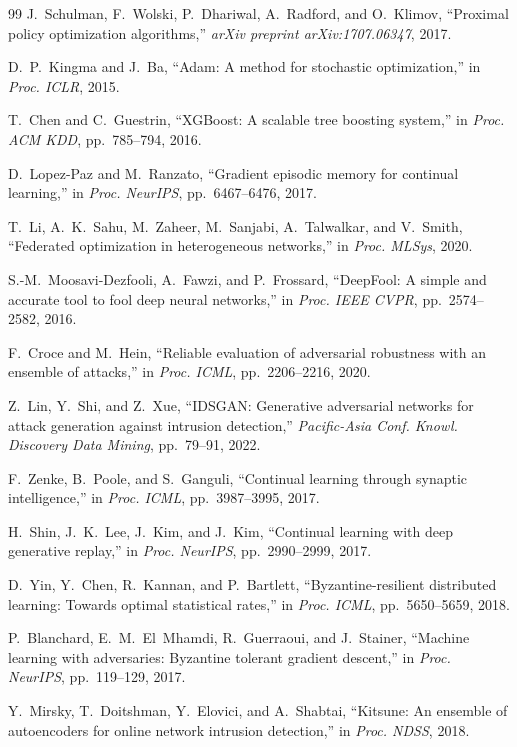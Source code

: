 \documentclass[journal,twoside]{IEEEtran}
\begin{document}
\begin{thebibliography}{99}
J.~Schulman, F.~Wolski, P.~Dhariwal, A.~Radford, and O.~Klimov, ``Proximal policy optimization algorithms,'' \emph{arXiv preprint arXiv:1707.06347}, 2017.

D.~P.~Kingma and J.~Ba, ``Adam: A method for stochastic optimization,'' in \emph{Proc. ICLR}, 2015.

T.~Chen and C.~Guestrin, ``XGBoost: A scalable tree boosting system,'' in \emph{Proc. ACM KDD}, pp.~785--794, 2016.

D.~Lopez-Paz and M.~Ranzato, ``Gradient episodic memory for continual learning,'' in \emph{Proc. NeurIPS}, pp.~6467--6476, 2017.

T.~Li, A.~K.~Sahu, M.~Zaheer, M.~Sanjabi, A.~Talwalkar, and V.~Smith, ``Federated optimization in heterogeneous networks,'' in \emph{Proc. MLSys}, 2020.

S.-M.~Moosavi-Dezfooli, A.~Fawzi, and P.~Frossard, ``DeepFool: A simple and accurate tool to fool deep neural networks,'' in \emph{Proc. IEEE CVPR}, pp.~2574--2582, 2016.

F.~Croce and M.~Hein, ``Reliable evaluation of adversarial robustness with an ensemble of attacks,'' in \emph{Proc. ICML}, pp.~2206--2216, 2020.

Z.~Lin, Y.~Shi, and Z.~Xue, ``IDSGAN: Generative adversarial networks for attack generation against intrusion detection,'' \emph{Pacific-Asia Conf. Knowl. Discovery Data Mining}, pp.~79--91, 2022.

F.~Zenke, B.~Poole, and S.~Ganguli, ``Continual learning through synaptic intelligence,'' in \emph{Proc. ICML}, pp.~3987--3995, 2017.

H.~Shin, J.~K.~Lee, J.~Kim, and J.~Kim, ``Continual learning with deep generative replay,'' in \emph{Proc. NeurIPS}, pp.~2990--2999, 2017.

D.~Yin, Y.~Chen, R.~Kannan, and P.~Bartlett, ``Byzantine-resilient distributed learning: Towards optimal statistical rates,'' in \emph{Proc. ICML}, pp.~5650--5659, 2018.

P.~Blanchard, E.~M.~El~Mhamdi, R.~Guerraoui, and J.~Stainer, ``Machine learning with adversaries: Byzantine tolerant gradient descent,'' in \emph{Proc. NeurIPS}, pp.~119--129, 2017.

Y.~Mirsky, T.~Doitshman, Y.~Elovici, and A.~Shabtai, ``Kitsune: An ensemble of autoencoders for online network intrusion detection,'' in \emph{Proc. NDSS}, 2018.


\end{thebibliography}
\end{document}
